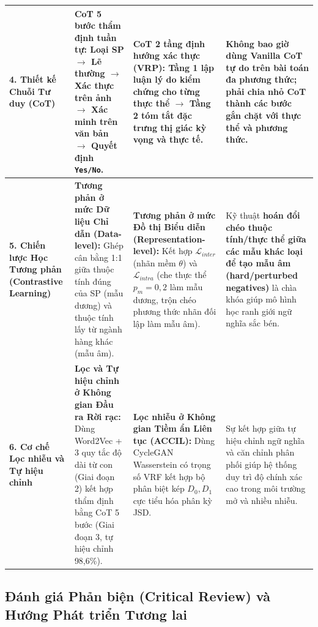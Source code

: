 \documentclass[conference,10pt]{IEEEtran}
\begin{document}
\begin{table}[!t]
\begin{tabularx}{\textwidth}{L{2.8cm} Y Y Y}
\midrule
\textbf{4. Thiết kế Chuỗi Tư duy (CoT)} & \textbf{CoT 5 bước thẩm định tuần tự:} Loại SP $\rightarrow$ Lẽ thường $\rightarrow$ Xác thực trên ảnh $\rightarrow$ Xác minh trên văn bản $\rightarrow$ Quyết định \texttt{Yes/No}. & \textbf{CoT 2 tầng định hướng xác thực (VRP):} Tầng 1 lập luận lý do kiểm chứng cho từng thực thể $\rightarrow$ Tầng 2 tóm tắt đặc trưng thị giác kỳ vọng và thực tế. & \textbf{Không bao giờ dùng Vanilla CoT tự do} trên bài toán đa phương thức; phải chia nhỏ CoT thành các bước gắn chặt với thực thể và phương thức. \\
\midrule
\textbf{5. Chiến lược Học Tương phản (Contrastive Learning)} & \textbf{Tương phản ở mức Dữ liệu Chỉ dẫn (Data-level):} Ghép cân bằng 1:1 giữa thuộc tính đúng của SP (mẫu dương) và thuộc tính lấy từ ngành hàng khác (mẫu âm). & \textbf{Tương phản ở mức Đồ thị Biểu diễn (Representation-level):} Kết hợp $\mathcal{L}_{inter}$ (nhãn mềm $\theta$) và $\mathcal{L}_{intra}$ (che thực thể $p_m=0,2$ làm mẫu dương, trộn chéo phương thức nhãn đối lập làm mẫu âm). & Kỹ thuật \textbf{hoán đổi chéo thuộc tính/thực thể giữa các mẫu khác loại để tạo mẫu âm (hard/perturbed negatives)} là chìa khóa giúp mô hình học ranh giới ngữ nghĩa sắc bén. \\
\midrule
\textbf{6. Cơ chế Lọc nhiễu và Tự hiệu chỉnh} & \textbf{Lọc và Tự hiệu chỉnh ở Không gian Đầu ra Rời rạc:} Dùng Word2Vec + 3 quy tắc độ dài từ con (Giai đoạn 2) kết hợp thẩm định bằng CoT 5 bước (Giai đoạn 3, tự hiệu chỉnh 98,6\%). & \textbf{Lọc nhiễu ở Không gian Tiềm ẩn Liên tục (ACCIL):} Dùng CycleGAN Wasserstein có trọng số VRF kết hợp bộ phân biệt kép $D_0, D_1$ cực tiểu hóa phân kỳ JSD. & Sự kết hợp giữa tự hiệu chỉnh ngữ nghĩa và căn chỉnh phân phối giúp hệ thống duy trì độ chính xác cao trong môi trường mở và nhiều nhiễu. \\
\bottomrule
\end{tabularx}
\end{table}

\subsection{Đánh giá Phản biện (Critical Review) và Hướng Phát triển Tương lai}
\end{document}
